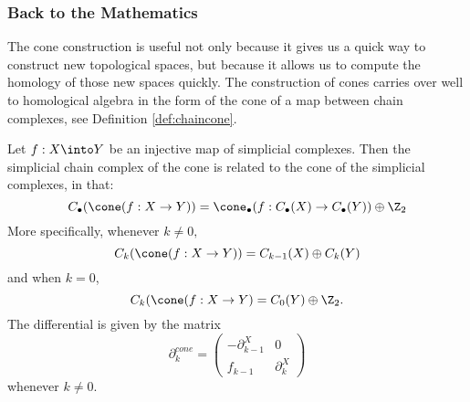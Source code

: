 \subsubsection{Back to the Mathematics}
The cone construction is useful not only because it gives us a quick way to construct new topological spaces, but because it allows us to compute the homology of those new spaces quickly. The construction of cones carries over well to homological algebra in the form of the cone of a map between chain complexes, see Definition \ref{def:chaincone}.
\begin{claim}
Let $f: X\into Y$ be an injective map of simplicial complexes.  Then the simplicial chain complex of the cone is related to the cone of the simplicial complexes, in that:
\[C_\bullet(\cone(f: X\to Y))= \cone_\bullet(f:C_\bullet(X)\to C_\bullet(Y)) \oplus \Z_2\]
More specifically, whenever $k\neq 0,$
\[C_k(\cone(f: X\to Y)) = C_{k-1}(X)\oplus C_k(Y)\]
and when $k=0$, 
\[C_k(\cone(f:X\to Y)=C_0(Y)\oplus \Z_2.\]
The differential is given by the matrix
\[
\partial_k^{cone}=\begin{pmatrix} -\partial^X_{k-1}&0\\ f_{k-1} & \partial_{k}^X \end{pmatrix}
\]
whenever $k\neq 0$. 
\end{claim}
